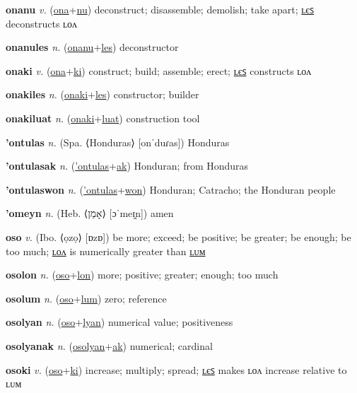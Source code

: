 \textbf{\hypertarget{onanu}{onanu}} \textit{v.} (\hyperlink{ona}{ona}+\allowbreak \hyperlink{nu}{nu})
deconstruct; disassemble; demolish; take apart; \hyperlink{onanules}{ʟєꜱ} deconstructs ʟᴏᴧ

\textbf{\hypertarget{onanules}{onanules}} \textit{n.} (\hyperlink{onanu}{onanu}+\allowbreak \hyperlink{les}{les})
deconstructor

\textbf{\hypertarget{onaki}{onaki}} \textit{v.} (\hyperlink{ona}{ona}+\allowbreak \hyperlink{ki}{ki})
construct; build; assemble; erect; \hyperlink{onakiles}{ʟєꜱ} constructs ʟᴏᴧ

\textbf{\hypertarget{onakiles}{onakiles}} \textit{n.} (\hyperlink{onaki}{onaki}+\allowbreak \hyperlink{les}{les})
constructor; builder

\textbf{\hypertarget{onakiluat}{onakiluat}} \textit{n.} (\hyperlink{onaki}{onaki}+\allowbreak \hyperlink{luat}{luat})
construction tool

\textbf{\hypertarget{'ontulas}{'ontulas}} \textit{n.} (Spa. ⟨Honduras⟩ [onˈduɾas])
Honduras

\textbf{\hypertarget{'ontulasak}{'ontulasak}} \textit{n.} (\hyperlink{'ontulas}{'ontulas}+\allowbreak \hyperlink{ak}{ak})
Honduran; from Honduras

\textbf{\hypertarget{'ontulaswon}{'ontulaswon}} \textit{n.} (\hyperlink{'ontulas}{'ontulas}+\allowbreak \hyperlink{won}{won})
Honduran; Catracho; the Honduran people

\textbf{\hypertarget{'omeyn}{'omeyn}} \textit{n.} (Heb. ⟨{\hebrew{}אָמֵן}⟩ [ɔˈmeɪ̯n])
amen

\textbf{\hypertarget{oso}{oso}} \textit{v.} (Ibo. ⟨ọzọ⟩ [ɒzɒ])
be more; exceed; be positive; be greater; be enough; be too much; \hyperlink{osolon}{ʟᴏᴧ} is numerically greater than \hyperlink{osolum}{ʟᴜᴍ}

\textbf{\hypertarget{osolon}{osolon}} \textit{n.} (\hyperlink{oso}{oso}+\allowbreak \hyperlink{lon}{lon})
more; positive; greater; enough; too much

\textbf{\hypertarget{osolum}{osolum}} \textit{n.} (\hyperlink{oso}{oso}+\allowbreak \hyperlink{lum}{lum})
zero; reference

\textbf{\hypertarget{osolyan}{osolyan}} \textit{n.} (\hyperlink{oso}{oso}+\allowbreak \hyperlink{lyan}{lyan})
numerical value; positiveness

\textbf{\hypertarget{osolyanak}{osolyanak}} \textit{n.} (\hyperlink{osolyan}{osolyan}+\allowbreak \hyperlink{ak}{ak})
numerical; cardinal

\textbf{\hypertarget{osoki}{osoki}} \textit{v.} (\hyperlink{oso}{oso}+\allowbreak \hyperlink{ki}{ki})
increase; multiply; spread; \hyperlink{osokiles}{ʟєꜱ} makes ʟᴏᴧ increase relative to ʟᴜᴍ

